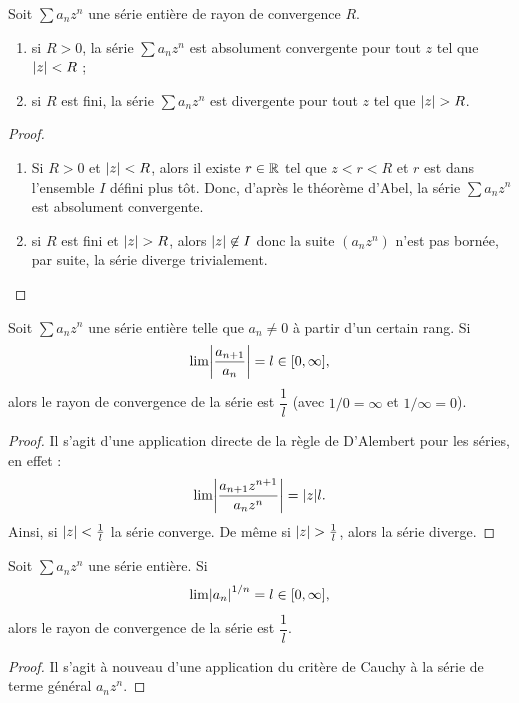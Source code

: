\documentclass[french]{article}
\begin{document}
\begin{thm}
Soit $\sum a_n z^n$ une série entière de rayon de convergence $R$.
\begin{enumerate}[label=(\roman)]
\item si $R > 0$, la série $\sum a_n z^n$ est absolument convergente pour tout $z$ tel que $\lvert z\rvert < R$ ;
\item si $R$ est fini, la série $\sum a_n z^n$ est divergente pour tout $z$ tel que $\lvert z\rvert > R$.
\end{enumerate}
\end{thm}

\begin{proof}
\begin{enumerate}[label=(\roman)]
\item Si $R>0$ et $\lvert z\rvert < R$, alors il existe $r \in \mathbb{R}$ tel que $z < r < R$ et $r$ est dans l'ensemble $I$ défini plus tôt.
Donc, d'après le théorème d'Abel, la série $\sum a_n z^n$ est absolument convergente.
\item si $R$ est fini et $\lvert z\rvert > R$, alors $\lvert z\rvert \not \in I$ donc la suite $(a_n z^n)$ n'est pas bornée, par suite, la série diverge
trivialement.
\end{enumerate}
\end{proof}

\begin{thm}[D'Alembert]
Soit $\sum a_n z^n$ une série entière telle que $a_n \neq 0$ à partir d'un certain rang. Si
\[ \lim \abs*{\dfrac{a_{n+1}}{a_n}} = l \in [0, \infty], \]
alors le rayon de convergence de la série est $\dfrac1{l}$ (avec $1/0 = \infty$ et $1/\infty = 0$). 
\end{thm}

\begin{proof}
Il s'agit d'une application directe de la règle de D'Alembert pour les séries, en effet :
\[ \lim \abs*{\dfrac{a_{n+1}z^{n+1}}{a_nz^n}} = \abs{z} l . \]
Ainsi, si $\lvert z\rvert < \frac{1}{l}$ la série converge. De même si $\lvert z\rvert > \frac{1}{l}$, alors la série diverge.
\end{proof}

\begin{thm}[Cauchy]
Soit $\sum a_n z^n$ une série entière. Si 
\[ \lim \abs*{a_n}^{1/n} = l \in [0, \infty], \]
alors le rayon de convergence de la série est $\dfrac1{l}$. 
\end{thm}

\begin{proof}
Il s'agit à nouveau d'une application du critère de Cauchy à la série de terme général $a_n z^n$.
\end{proof}
\end{document}
